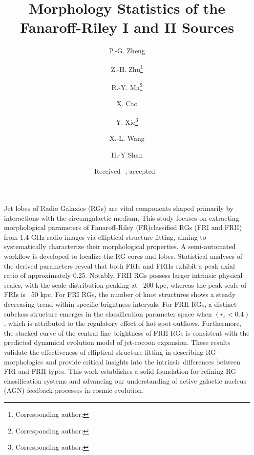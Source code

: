 \documentclass{aa}
\begin{document}
 

\renewcommand{\arraystretch}{1.5}
   
    \title{
    Morphology Statistics of the Fanaroff-Riley I and II Sources
    }

    \author{
        P.-G. Zheng
    \and Z.-H. Zhu\thanks{Corresponding author: }
    \and R.-Y. Ma\thanks{Corresponding author: }
    \and X. Cao
    \and Y. Xie\thanks{Corresponding author: }
    \and X.-L. Wang
    \and H.-Y Shan
    }
    


   \date{Received -; accepted -}


 \abstract
   {
   Jet lobes of Radio Galaxies (RGs) are vital components shaped primarily by interactions with the circumgalactic medium. This study focuses on extracting morphological parameters of Fanaroff-Riley (FR)\textemdash classified RGs (FRI and FRII) from 1.4 GHz radio images via elliptical structure fitting, aiming to systematically characterize their morphological properties. A semi-automated workflow is developed to localize the RG cores and lobes. Statistical analyses of the derived parameters reveal that both FRIs and FRIIs exhibit a peak axial ratio of approximately 0.25. Notably, FRII RGs possess larger intrinsic physical scales, with the scale distribution peaking at ~200 kpc, whereas the peak scale of FRIs is ~50 kpc. For FRI RGs, the number of knot structures shows a steady decreasing trend within specific brightness intervals. For FRII RGs, a distinct subclass structure emerges in the classification parameter space when $(r_s < 0.4)$, which is attributed to the regulatory effect of hot spot outflows. Furthermore, the stacked curve of the central line brightness of FRII RGs is consistent with the predicted dynamical evolution model of jet-cocoon expansion. These results validate the effectiveness of elliptical structure fitting in describing RG morphologies and provide critical insights into the intrinsic differences between FRI and FRII types. This work establishes a solid foundation for refining RG classification systems and advancing our understanding of active galactic nucleus (AGN) feedback processes in cosmic evolution. 
   }
   
\end{document}
